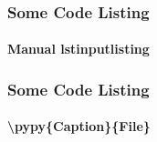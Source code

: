 \begin{frame}[fragile]
\frametitle{Some Code Listing}
\framesubtitle{Manual lstinputlisting}



\end{frame}


\begin{frame}[fragile]
\frametitle{Some Code Listing}
\framesubtitle{\textbackslash pypy\{Caption\}\{File\}}



\end{frame}






